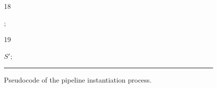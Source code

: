 \begin{figure}[!t]
\begin{ourcolor}
\begin{tabbing}
      \begin{redtext}18\end{redtext};\\
      \begin{redtext}19\end{redtext} $S'$;\\
    \end{tabbing}
  \end{ourcolor}
  \hrule
  \vspace{10pt}
  \caption{\label{fig:instantiate-pseudocode} Pseudocode of the pipeline instantiation process.}
\end{figure}
